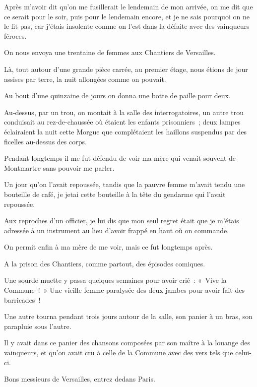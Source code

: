 \documentclass[french,twoside]{book} %
\newenvironment{quoteblock}%
  {\begin{quoting}}
  {\end{quoting}}
\newenvironment{quotebar}{%
    \def\FrameCommand{{\color{rubric!10!}\vrule width 0.5em} \hspace{0.9em}}%
    \def\OuterFrameSep{\itemsep} %
    \MakeFramed {\advance\hsize-\width \FrameRestore}
  }%
  {%
    \endMakeFramed
  }
\renewenvironment{quoteblock}%
  {%
    \savenotes
    \setstretch{0.9}
    \normalfont
    \begin{quotebar}
  }
  {%
    \end{quotebar}
    \spewnotes
  }
\begin{document}
Après m’avoir dit qu’on me fusillerait le lendemain  de mon arrivée, on me dit que ce serait pour le soir, puis pour le lendemain encore, et je ne sais pourquoi on ne le fit pas, car j’étais insolente comme on l’est dans la défaite avec des vainqueurs féroces.\par
On nous envoya une trentaine de femmes aux Chantiers de Versailles.\par
Là, tout autour d’une grande pièce carrée, au premier étage, nous étions de jour assises par terre, la nuit allongées comme on pouvait.\par
Au bout d’une quinzaine de jours on donna une botte de paille pour deux.\par
Au-dessus, par un trou, on montait à la salle des interrogatoires, un autre trou conduisait au rez-de-chaussée où étaient les enfants prisonniers ; deux lampes éclairaient la nuit cette Morgue que complétaient les haillons suspendus par des ficelles au-dessus des corps.\par
Pendant longtemps il me fut défendu de voir ma mère qui venait souvent de Montmartre sans pouvoir me parler.\par
Un jour qu’on l’avait repoussée, tandis que la pauvre femme m’avait tendu une bouteille de café, je jetai cette bouteille à la tête du gendarme qui l’avait repoussée.\par
Aux reproches d’un officier, je lui dis que mon seul regret était que je m’étais adressée à un  instrument au lieu d’avoir frappé en haut où on commande.\par
On permit enfin à ma mère de me voir, mais ce fut longtemps après.\par
A la prison des Chantiers, comme partout, des épisodes comiques.\par
Une sourde muette y passa quelques semaines pour avoir crié : « Vive la Commune ! » Une vieille femme paralysée des deux jambes pour avoir fait des barricades !\par
Une autre tourna pendant trois jours autour de la salle, son panier à un bras, son parapluie sous l’autre.\par
Il y avait dans ce panier des chansons composées par son maître à la louange des vainqueurs, et qu’on avait cru à celle de la Commune avec des vers tels que celui-ci.\par

\begin{quoteblock}
 \noindent Bons messieurs de Versailles, entrez dedans Paris.
 \end{quoteblock}
\end{document}
